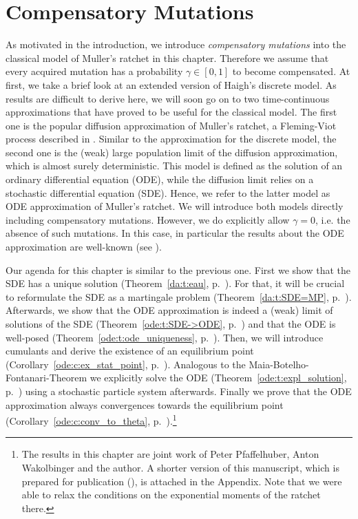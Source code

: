 \chapter{Compensatory Mutations}
\label{cm:chapter}
As motivated in the introduction, we introduce \emph{compensatory mutations}
into the classical model of Muller's ratchet in this chapter. Therefore we
assume that every acquired mutation has a probability $\gamma \in [0,1]$ to
become compensated.
At first, we take a brief look at an extended version of Haigh's discrete model. As results are
difficult to derive here, we will soon go on to two time-continuous approximations that have proved
to be useful for the classical model. The first one is the popular diffusion approximation of
Muller's ratchet, a Fleming-Viot process described in \cite{etheridge_how_2008}.
Similar to the approximation for the discrete model, the second one is the (weak) large population
limit of the diffusion approximation, which is almost surely deterministic. This model is
defined as the solution of an ordinary differential equation (ODE), while the
diffusion limit relies on a stochastic differential equation (SDE). Hence, we refer to the latter model as ODE approximation
of Muller's ratchet. We will introduce both models directly including compensatory mutations.
However, we do explicitly allow $\gamma = 0$, i.e. the absence of such mutations. In this case, in
particular the results about the ODE approximation are well-known (see \cite{etheridge_how_2008}).

Our agenda for this chapter is similar to the  previous one. First we
show that the SDE has a unique solution (Theorem~\ref{da:t:eau}, p.~\pageref{da:t:eau}). For that, it will be crucial to
reformulate the SDE as a martingale problem (Theorem~\ref{da:t:SDE=MP}, p.~\pageref{da:t:SDE=MP}).
Afterwards, we show that the ODE approximation is indeed a (weak) limit of solutions of the SDE
(Theorem~\ref{ode:t:SDE->ODE}, p.~\pageref{ode:t:SDE->ODE}) and that the ODE is well-posed
(Theorem~\ref{ode:t:ode_uniqueness}, p.~\pageref{ode:t:ode_uniqueness}). Then, we will introduce
cumulants and derive the existence of an equilibrium point
(Corollary~\ref{ode:c:ex_stat_point}, p.~\pageref{ode:c:ex_stat_point}). Analogous to the Maia-Botelho-Fontanari-Theorem we
explicitly solve the ODE (Theorem~\ref{ode:t:expl_solution}, p.~\pageref{ode:t:expl_solution}) using
a stochastic particle system afterwards. Finally we prove that the ODE approximation always
convergences towards the equilibrium point (Corollary~\ref{ode:c:conv_to_theta},
p.~\pageref{ode:c:conv_to_theta}).\footnote{The results in this chapter are
joint work of Peter Pfaffelhuber, Anton Wakolbinger and the author. A
shorter version of this manuscript, which is prepared for publication
(\citet{pfaffelhuber_mullers_2011}), is attached in the Appendix. Note that we were
able to relax the conditions on the exponential moments of the ratchet there.}


